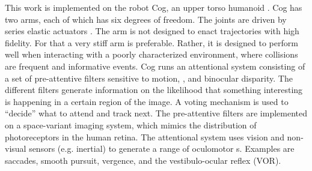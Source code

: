 This work is implemented on the robot Cog, an upper torso humanoid
\cite{brooks99cog}.  
Cog has two arms, each of which has six
degrees of freedom. %
The joints are driven by series elastic
actuators \cite{williamson99robot}.
The arm is not designed to enact trajectories with
high fidelity.  For that a very stiff arm is preferable.  Rather, it
is designed to perform well when interacting with a poorly
characterized environment, where collisions are frequent and
informative events.
Cog runs an attentional system consisting of a set of pre-attentive
filters sensitive to motion, \ahhcolor{}, and binocular disparity. The
different filters generate information on the likelihood that
something interesting is happening in a certain region of the image. A
voting mechanism is used to ``decide'' what to attend and track
next. The pre-attentive filters are implemented on a space-variant
imaging system, which mimics the distribution
of photoreceptors in the human retina.
 The attentional system uses vision and non-visual sensors
(e.g. inertial) to generate a range of oculomotor \ahhbehavior{}s. Examples
are saccades, smooth pursuit, vergence, and the vestibulo-ocular
reflex (VOR).






